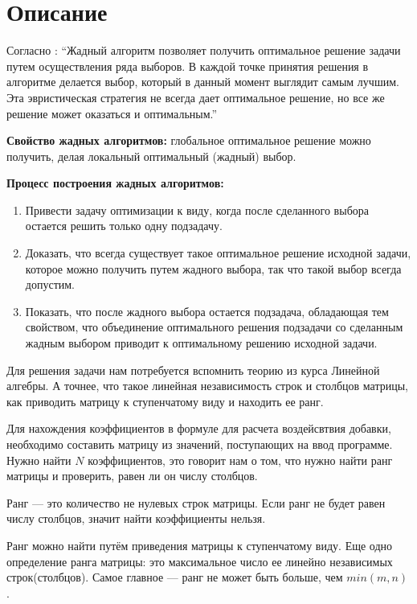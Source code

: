 \section{Описание}

Согласно \cite{Kormen}: \enquote{Жадный алгоритм позволяет получить оптимальное решение задачи путем
осуществления ряда выборов. В каждой точке принятия решения в алгоритме делается выбор, 
который в данный момент выглядит самым лучшим. Эта эвристическая стратегия не всегда дает оптимальное решение, 
но все же решение может оказаться и оптимальным.}

{\bfseries Свойство жадных алгоритмов:} глобальное оптимальное решение можно получить,
делая локальный оптимальный (жадный) выбор.

{\bfseries Процесс построения жадных алгоритмов:}

\begin{enumerate}
    \item Привести задачу оптимизации к виду, когда после сделанного выбора остается решить только одну подзадачу.
    \item Доказать, что всегда существует такое оптимальное решение исходной задачи, 
    которое можно получить путем жадного выбора, так что такой выбор всегда допустим.
    \item Показать, что после жадного выбора остается подзадача, обладающая тем
    свойством, что объединение оптимального решения подзадачи со сделанным
    жадным выбором приводит к оптимальному решению исходной задачи.
\end{enumerate}


Для решения задачи нам потребуется вспомнить теорию из курса Линейной алгебры. А точнее, что такое линейная независимость строк и 
столбцов матрицы, как приводить матрицу к ступенчатому виду и находить ее ранг.

Для нахождения коэффициентов в формуле для расчета воздейсвтвия добавки, необходимо составить матрицу из значений, поступающих на
ввод программе. Нужно найти $N$ коэффициентов, это говорит нам о том, что нужно найти ранг матрицы и проверить, равен ли он числу столбцов.

Ранг --- это количество не нулевых строк матрицы. Если ранг не будет равен числу столбцов, значит найти коэффициенты нельзя.

Ранг можно найти путём приведения матрицы к ступенчатому виду. Еще одно определение ранга матрицы: это максимальное число ее линейно 
независимых строк(столбцов). Самое главное --- ранг не может быть больше, чем $min(m, n)$.

